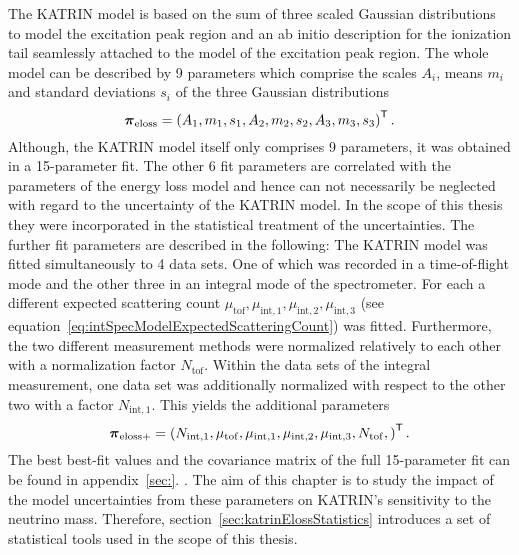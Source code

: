 The KATRIN model is based on the sum of three scaled Gaussian distributions to model the excitation peak region and an ab initio description for the ionization tail seamlessly attached to the model of the excitation peak region. The whole model can be described by 9 parameters which comprise the scales $A_i$, means $m_i$ and standard deviations $s_i$ of the three Gaussian distributions
\begin{equation}
	\boldsymbol{\mathbf{\pi}}_\mathrm{eloss} = 
	{\left(
	A_1, m_1, s_1, 
	A_2, m_2, s_2, 
	A_3, m_3, s_3
	\right)}^{\mathsf{T}}
	\text{\,.}
\end{equation}
Although, the KATRIN model itself only comprises 9 parameters, it was obtained in a 15-parameter fit. The other 6 fit parameters are correlated with the parameters of the energy loss model and hence can not necessarily be neglected with regard to the uncertainty of the KATRIN model. In the scope of this thesis they were incorporated in the statistical treatment of the uncertainties. The further fit parameters are described in the following: The KATRIN model was fitted simultaneously to 4 data sets. One of which was recorded in a time-of-flight mode and the other three in an integral mode of the spectrometer.  For each a different expected scattering count $\mu_\mathrm{tof}, \mu_{\mathrm{int},1}, \mu_{\mathrm{int},2}, \mu_{\mathrm{int},3}$ (see equation~\eqref{eq:intSpecModelExpectedScatteringCount}) was fitted. Furthermore, the two different measurement methods were normalized relatively to each other with a normalization factor $N_\mathrm{tof}$. Within the data sets of the integral measurement, one data set was additionally normalized with respect to the other two with a factor $N_{\mathrm{int},1}$. This yields the additional parameters
\begin{equation}
	\boldsymbol{\mathbf{\pi}}_\mathrm{eloss+} = 
	{\left(
		N_{\mathrm{int},1},
		\mu_\mathrm{tof},
		\mu_{\mathrm{int},1}, 
		\mu_{\mathrm{int},2}, 
		\mu_{\mathrm{int},3},
		N_\mathrm{tof},
		\right)}^{\mathsf{T}}
	\text{\,.}
\end{equation}
The best best-fit values and the covariance matrix of the full 15-parameter fit can be found in appendix~\ref{sec:}. . The aim of this chapter is to study the impact of the model uncertainties from these parameters on KATRIN's sensitivity to the neutrino mass. Therefore, section~\ref{sec:katrinElossStatistics} introduces a set of statistical tools used in the scope of this thesis.



